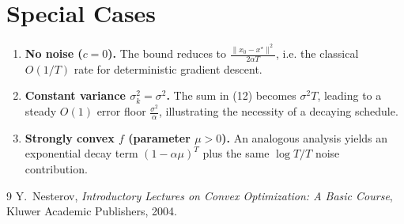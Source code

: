 \documentclass{article}
\begin{document}
\section*{Special Cases}
\begin{enumerate}
\item \textbf{No noise ($c=0$).}  The bound reduces to $\frac{\|x_0-x^\star\|^2}{2\alpha T}$, i.e. the classical $O(1/T)$ rate for deterministic gradient descent.
\item \textbf{Constant variance $\sigma_k^2=\sigma^2$.}  The sum in (12) becomes $\sigma^2 T$, leading to a steady $O(1)$ error floor $\frac{\sigma^2}{\alpha}$, illustrating the necessity of a decaying schedule.
\item \textbf{Strongly convex $f$ (parameter $\mu>0$).}  An analogous analysis yields an exponential decay term $ (1-\alpha\mu)^T$ plus the same $\log T/T$ noise contribution.
\end{enumerate}

\begin{thebibliography}{9}
Y.~Nesterov,
\emph{Introductory Lectures on Convex Optimization: A Basic Course},
Kluwer Academic Publishers, 2004.
\end{thebibliography}
\end{document}
